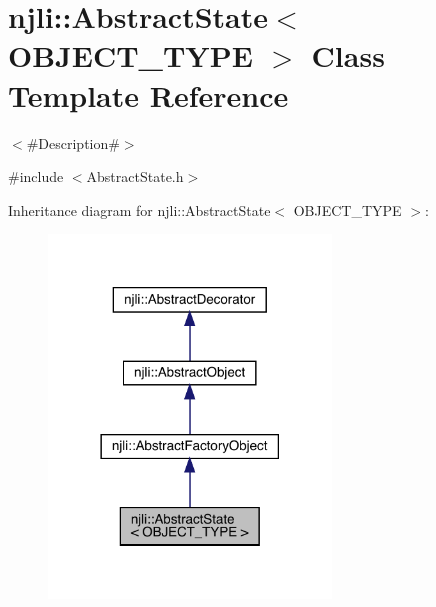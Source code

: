 \hypertarget{classnjli_1_1_abstract_state}{}\section{njli\+:\+:Abstract\+State$<$ O\+B\+J\+E\+C\+T\+\_\+\+T\+Y\+PE $>$ Class Template Reference}
\label{classnjli_1_1_abstract_state}


$<$\#\+Description\#$>$  




{\ttfamily \#include $<$Abstract\+State.\+h$>$}



Inheritance diagram for njli\+:\+:Abstract\+State$<$ O\+B\+J\+E\+C\+T\+\_\+\+T\+Y\+PE $>$\+:\nopagebreak
\begin{figure}[H]
\begin{center}
\leavevmode
\includegraphics[width=213pt]{classnjli_1_1_abstract_state__inherit__graph}
\end{center}
\end{figure}


